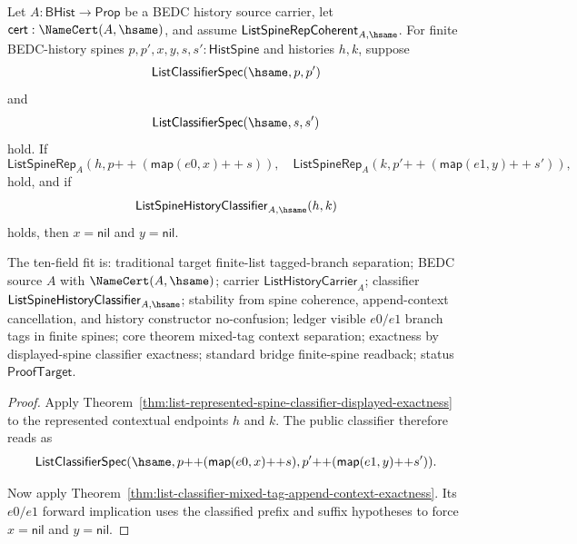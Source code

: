 \begin{theorem}
\label{thm:list-represented-spine-mixed-tag-context-separation}
Let $A:\mathsf{BHist}\to\mathsf{Prop}$ be a BEDC history source carrier, let
$\mathsf{cert}:\NameCert(A,\hsame)$, and assume
$\mathsf{ListSpineRepCoherent}_{A,\hsame}$. For finite BEDC-history spines
$p,p',x,y,s,s':\mathsf{HistSpine}$ and histories $h,k$, suppose
$$
\mathsf{ListClassifierSpec}(\hsame,p,p')
$$
and
$$
\mathsf{ListClassifierSpec}(\hsame,s,s')
$$
hold. If
$$
\mathsf{ListSpineRep}_A(h,p{++}(\mathsf{map}(e0,x){++}s)),
\quad
\mathsf{ListSpineRep}_A(k,p'{++}(\mathsf{map}(e1,y){++}s')),
$$
hold, and if
$$
\mathsf{ListSpineHistoryClassifier}_{A,\hsame}(h,k)
$$
holds, then $x=\mathsf{nil}$ and $y=\mathsf{nil}$.

The ten-field fit is: traditional target finite-list tagged-branch separation;
BEDC source $A$ with $\NameCert(A,\hsame)$; carrier
$\mathsf{ListHistoryCarrier}_A$; classifier
$\mathsf{ListSpineHistoryClassifier}_{A,\hsame}$; stability from spine
coherence, append-context cancellation, and history constructor no-confusion;
ledger visible $e0/e1$ branch tags in finite spines; core theorem mixed-tag
context separation; exactness by displayed-spine classifier exactness; standard
bridge finite-spine readback; status $\mathsf{ProofTarget}$.
\end{theorem}
\begin{proof}
Apply Theorem~\ref{thm:list-represented-spine-classifier-displayed-exactness}
to the represented contextual endpoints $h$ and $k$. The public classifier
therefore reads as
$$
\mathsf{ListClassifierSpec}(\hsame,
  p{++}(\mathsf{map}(e0,x){++}s),
  p'{++}(\mathsf{map}(e1,y){++}s')).
$$

Now apply
Theorem~\ref{thm:list-classifier-mixed-tag-append-context-exactness}. Its
$e0/e1$ forward implication uses the classified prefix and suffix hypotheses to
force $x=\mathsf{nil}$ and $y=\mathsf{nil}$.
\end{proof}

